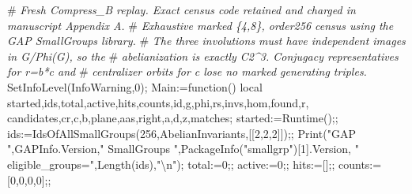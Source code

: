 \documentclass[
  10pt,
  letterpaper,
]{article}
\newenvironment{Shaded}{}{}
\newcommand{\BuiltInTok}[1]{\textcolor[rgb]{0.00,0.50,0.00}{#1}}
\newcommand{\CommentTok}[1]{\textcolor[rgb]{0.38,0.63,0.69}{\textit{#1}}}
\newcommand{\ExtensionTok}[1]{#1}
\newcommand{\FloatTok}[1]{\textcolor[rgb]{0.25,0.63,0.44}{#1}}
\newcommand{\FunctionTok}[1]{\textcolor[rgb]{0.02,0.16,0.49}{#1}}
\newcommand{\NormalTok}[1]{#1}
\newcommand{\OperatorTok}[1]{\textcolor[rgb]{0.40,0.40,0.40}{#1}}
\newcommand{\StringTok}[1]{\textcolor[rgb]{0.25,0.44,0.63}{#1}}
\newcommand{\VariableTok}[1]{\textcolor[rgb]{0.10,0.09,0.49}{#1}}
\begin{document}
\begin{Shaded}
\begin{Highlighting}[]
\NormalTok{\#}\CommentTok{ Fresh Compress\_B replay. Exact census code retained and charged in manuscript Appendix A.}
\NormalTok{\#}\CommentTok{ Exhaustive marked \{4,8\}, order256 census using the GAP SmallGroups library.}
\NormalTok{\#}\CommentTok{ The three involutions must have independent images in G/Phi(G), so the}
\NormalTok{\#}\CommentTok{ abelianization is exactly C2\^{}3. Conjugacy representatives for r=b*c and}
\NormalTok{\#}\CommentTok{ centralizer orbits for c lose no marked generating triples.}
\BuiltInTok{SetInfoLevel}\NormalTok{(}\BuiltInTok{InfoWarning}\OperatorTok{,}\FloatTok{0}\NormalTok{)}\OperatorTok{;}
\VariableTok{Main}\OperatorTok{:=}\FunctionTok{function}\NormalTok{()}
\ExtensionTok{local} \VariableTok{started}\OperatorTok{,}\VariableTok{ids}\OperatorTok{,}\VariableTok{total}\OperatorTok{,}\VariableTok{active}\OperatorTok{,}\VariableTok{hits}\OperatorTok{,}\VariableTok{counts}\OperatorTok{,}\VariableTok{id}\OperatorTok{,}\VariableTok{g}\OperatorTok{,}\VariableTok{phi}\OperatorTok{,}\VariableTok{rs}\OperatorTok{,}\VariableTok{invs}\OperatorTok{,}\VariableTok{hom}\OperatorTok{,}\VariableTok{found}\OperatorTok{,}\VariableTok{r}\OperatorTok{,}
 \VariableTok{candidates}\OperatorTok{,}\VariableTok{cr}\OperatorTok{,}\VariableTok{c}\OperatorTok{,}\VariableTok{b}\OperatorTok{,}\VariableTok{plane}\OperatorTok{,}\VariableTok{aas}\OperatorTok{,}\VariableTok{right}\OperatorTok{,}\VariableTok{a}\OperatorTok{,}\VariableTok{d}\OperatorTok{,}\VariableTok{z}\OperatorTok{,}\VariableTok{matches}\OperatorTok{;}
\VariableTok{started}\OperatorTok{:=}\BuiltInTok{Runtime}\NormalTok{()}\OperatorTok{;;}
\VariableTok{ids}\OperatorTok{:=}\BuiltInTok{IdsOfAllSmallGroups}\NormalTok{(}\FloatTok{256}\OperatorTok{,}\BuiltInTok{AbelianInvariants}\OperatorTok{,}\NormalTok{[[}\FloatTok{2}\OperatorTok{,}\FloatTok{2}\OperatorTok{,}\FloatTok{2}\NormalTok{]])}\OperatorTok{;;}
\BuiltInTok{Print}\NormalTok{(}\StringTok{"GAP "}\OperatorTok{,}\BuiltInTok{GAPInfo}\NormalTok{.}\VariableTok{Version}\OperatorTok{,}\StringTok{" SmallGroups "}\OperatorTok{,}\BuiltInTok{PackageInfo}\NormalTok{(}\StringTok{"smallgrp"}\NormalTok{)[}\FloatTok{1}\NormalTok{].}\VariableTok{Version}\OperatorTok{,}
 \StringTok{" eligible\_groups="}\OperatorTok{,}\BuiltInTok{Length}\NormalTok{(}\VariableTok{ids}\NormalTok{)}\OperatorTok{,}\StringTok{"\textbackslash{}n"}\NormalTok{)}\OperatorTok{;}
\VariableTok{total}\OperatorTok{:=}\FloatTok{0}\OperatorTok{;;} \VariableTok{active}\OperatorTok{:=}\FloatTok{0}\OperatorTok{;;} \VariableTok{hits}\OperatorTok{:=}\NormalTok{[]}\OperatorTok{;;} \VariableTok{counts}\OperatorTok{:=}\NormalTok{[}\FloatTok{0}\OperatorTok{,}\FloatTok{0}\OperatorTok{,}\FloatTok{0}\OperatorTok{,}\FloatTok{0}\NormalTok{]}\OperatorTok{;;}

\end{Highlighting}
\end{Shaded}
\end{document}
